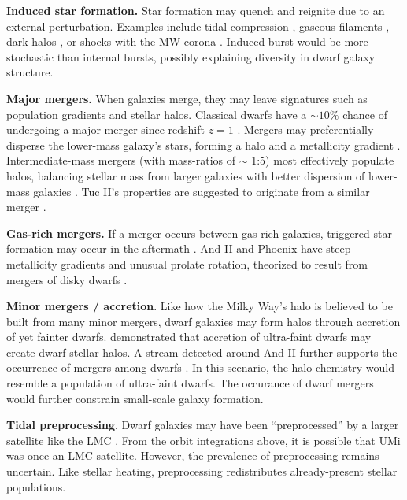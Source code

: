 \textbf{Induced star formation.} Star formation may quench and reignite
due to an external perturbation. Examples include tidal compression
\citep{mayer+2001a, dong+lin+murray2003}, gaseous filaments
\citep{genina+2019}, dark halos \citep{starkenburg+helmi+sales2016}, or
shocks with the MW corona \citep{wright+2019}. Induced burst would be
more stochastic than internal bursts, possibly explaining diversity in
dwarf galaxy structure.

\textbf{Major mergers.} When galaxies merge, they may leave signatures
such as population gradients and stellar halos. Classical dwarfs have a
\(\sim 10\%\) chance of undergoing a major merger since redshift \(z=1\)
\citep{deason+wetzel+garrison-kimmel2014}. Mergers may preferentially
disperse the lower-mass galaxy's stars, forming a halo and a metallicity
gradient \citep{benitez-llambay+2016}. Intermediate-mass mergers (with
mass-ratios of \(\sim\) 1:5) most effectively populate halos, balancing
stellar mass from larger galaxies with better dispersion of lower-mass
galaxies \citep{deason+2022}. Tuc II's properties are suggested to
originate from a similar merger
\citep{tarumi+yoshida+frebel2021, querci+2025}.

\textbf{Gas-rich mergers.} If a merger occurs between gas-rich galaxies,
triggered star formation may occur in the aftermath
\citep[e.g.,][]{genina+2019}. And II and Phoenix have steep metallicity
gradients and unusual prolate rotation, theorized to result from mergers
of disky dwarfs \citep{lokas+2014, fouquet+2017, cardona-barrero+2021}.

\textbf{Minor mergers / accretion}. Like how the Milky Way's halo is
believed to be built from many minor mergers, dwarf galaxies may form
halos through accretion of yet fainter dwarfs.
\citet{ricotti+polisensky+cleland2022} demonstrated that accretion of
ultra-faint dwarfs may create dwarf stellar halos. A stream detected
around And II further supports the occurrence of mergers among dwarfs
\citep{amorisco+evans+vandeven2014, roederer+2023}. In this scenario,
the halo chemistry would resemble a population of ultra-faint dwarfs.
The occurance of dwarf mergers would further constrain small-scale
galaxy formation.

\textbf{Tidal preprocessing}. Dwarf galaxies may have been
``preprocessed'' by a larger satellite like the LMC
\citep[e.g.,][]{santistevan+2023, riley+2024}. From the orbit
integrations above, it is possible that UMi was once an LMC satellite.
However, the prevalence of preprocessing remains uncertain. Like stellar
heating, preprocessing redistributes already-present stellar
populations.

